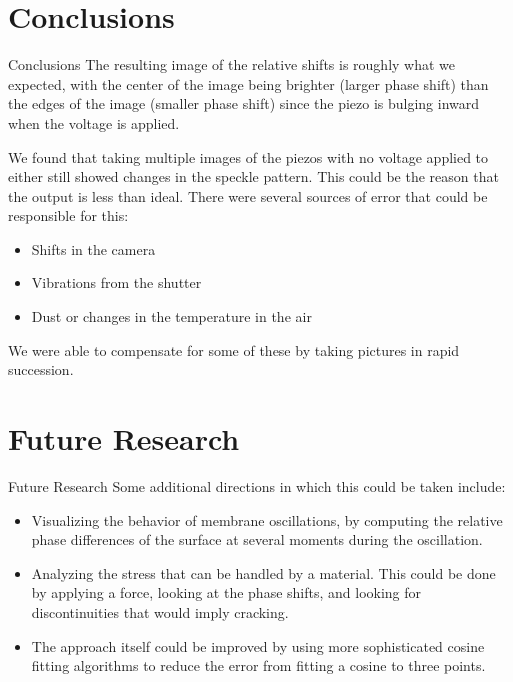 \documentclass[pdf]{beamer}
\begin{document}
\section{Conclusions}
\begin{frame}{Conclusions}
The resulting image of the relative shifts is roughly what we expected, with the center of the image being brighter (larger phase shift) than the edges of the image (smaller phase shift) since the piezo is bulging inward when the voltage is applied.

\vspace{0.3cm}
We found that taking multiple images of the piezos with no voltage applied to either still showed changes in the speckle pattern. This could be the reason that the output is less than ideal. There were several sources of error that could be responsible for this:
\begin{itemize}
	\item Shifts in the camera
	\item Vibrations from the shutter
	\item Dust or changes in the temperature in the air
\end{itemize}
We were able to compensate for some of these by taking pictures in rapid succession.
\end{frame}

\section{Future Research}
\begin{frame}{Future Research}
Some additional directions in which this could be taken include:
\begin{itemize}
\item{Visualizing the behavior of membrane oscillations, by computing the relative phase differences of the surface at several moments during the oscillation.}
\item{Analyzing the stress that can be handled by a material. This could be done by applying a force, looking at the phase shifts, and looking for discontinuities that would imply cracking.}
\item{The approach itself could be improved by using more sophisticated cosine fitting algorithms to reduce the error from fitting a cosine to three points.}
\end{itemize}
\end{frame}
\end{document}
